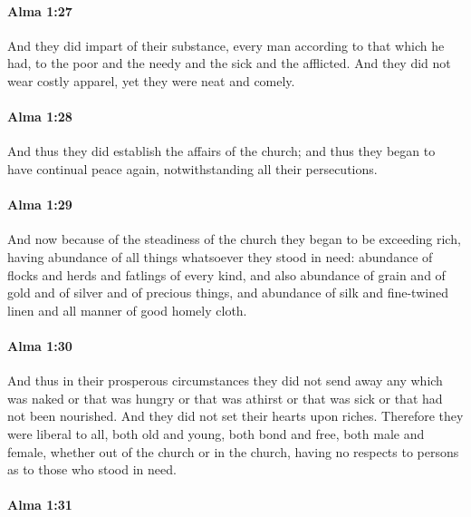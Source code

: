 		\paragraph{Alma 1:27} %
			\label{ALMA-1-27}

			And they did impart of their substance,
			every man according to that which he had,
			to the poor and the needy and the sick and the afflicted.
			And they did not wear costly apparel, yet they were neat and comely.

		\paragraph{Alma 1:28} %
			\label{ALMA-1-28}

			And thus they did establish the affairs of the church;
			and thus they began to have continual peace again,
			notwithstanding all their persecutions.

		\paragraph{Alma 1:29} %
			\label{ALMA-1-29}

			And now because of the steadiness of the church
			they began to be exceeding rich,
			having abundance of all things whatsoever they stood in need:
			abundance of flocks and herds and fatlings of every kind,
			and also abundance of grain and of gold and of silver and of precious things,
			and abundance of silk and fine-twined linen and all manner of good homely cloth.

		\paragraph{Alma 1:30} %
			\label{ALMA-1-30}

			And thus in their prosperous circumstances
			they did not send away any which was naked or that was hungry
			or that was athirst or that was sick or that had not been nourished.
			And they did not set their hearts upon riches.
			Therefore they were liberal to all,
			both old and young, both bond and free, both male and female,
			whether out of the church or in the church,
			having no respects to persons as to those who stood in need.

		\paragraph{Alma 1:31} %
			\label{ALMA-1-31}

